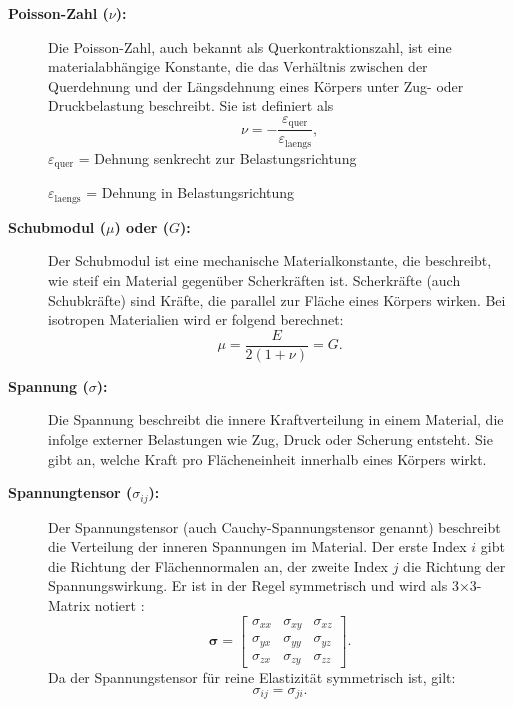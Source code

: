 \begin{description}
\item[\textbf{Poisson-Zahl ($\nu$):}] Die Poisson-Zahl, auch bekannt als Querkontraktionszahl, ist eine materialabhängige Konstante, die das Verhältnis zwischen der Querdehnung und der Längsdehnung eines Körpers unter Zug- oder Druckbelastung beschreibt.
Sie ist definiert als
	\begin{equation}
		\nu=
		-\frac{\varepsilon_\text{quer}}{\varepsilon_\text{laengs}},
	\end{equation}
	$\varepsilon_\text{quer}$ = Dehnung senkrecht zur Belastungsrichtung
	
	$\varepsilon_\text{laengs}$ = Dehnung in Belastungsrichtung
	
\item[\textbf{Schubmodul ($\mu$) oder ($G$):}] Der Schubmodul ist eine mechanische Materialkonstante, die beschreibt, wie steif ein Material gegenüber Scherkräften ist.
Scherkräfte (auch Schubkräfte) sind Kräfte, die parallel zur Fläche eines Körpers wirken. 
Bei isotropen Materialien wird er folgend berechnet:
	\begin{equation}
		\mu = 
		\frac{E}{2(1 + \nu)} =
		G.
	\end{equation}
\item[\textbf{Spannung ($\sigma$):}] Die Spannung beschreibt die innere Kraftverteilung in einem Material, die infolge externer Belastungen wie Zug, Druck oder Scherung entsteht. 
Sie gibt an, welche Kraft pro Flächeneinheit innerhalb eines Körpers wirkt.
	
\item[\textbf{Spannungtensor ($\sigma_{ij}$):}] Der Spannungstensor (auch Cauchy-Spannungstensor genannt) beschreibt die Verteilung der inneren Spannungen im Material. 
Der erste Index	$i$ gibt die Richtung der Flächennormalen an, der zweite Index $j$ die Richtung der Spannungswirkung. 
Er ist in der Regel symmetrisch und wird als 3×3-Matrix notiert \cite{elastomechanik:Grundlagen_der_Elastizitaetstheorie}:
	\begin{equation}
		\boldsymbol{\sigma} =
		\begin{bmatrix}
			\sigma_{xx} & \sigma_{xy} & \sigma_{xz} \\
			\sigma_{yx} & \sigma_{yy} & \sigma_{yz} \\
			\sigma_{zx} & \sigma_{zy} & \sigma_{zz}
		\end{bmatrix}.
	\end{equation}
Da der Spannungstensor für reine Elastizität symmetrisch ist, gilt:
	\begin{equation}
		\sigma_{ij} = 
		\sigma_{ji}.
	\end{equation}
	

\end{description}
